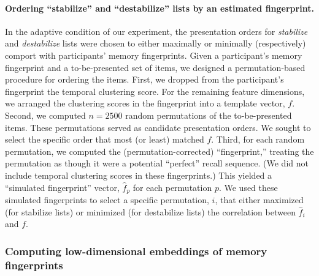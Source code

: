 \documentclass[11pt]{article}
\begin{document}
\paragraph{Ordering ``stabilize'' and ``destabilize'' lists by an estimated
fingerprint.}

In the adaptive condition of our experiment, the presentation orders for
\textit{stabilize} and \textit{destabilize} lists were chosen to either
maximally or minimally (respectively) comport with participants' memory
fingerprints. Given a participant's memory fingerprint and a to-be-presented
set of items, we designed a permutation-based procedure for ordering the items.
First, we dropped from the participant's fingerprint the temporal clustering
score. For the remaining feature dimensions, we arranged the clustering scores
in the fingerprint into a template vector, $f$. Second, we computed $n = 2500$
random permutations of the to-be-presented items. These permutations served as
candidate presentation orders. We sought to select the specific order that most
(or least) matched $f$. Third, for each random permutation, we computed the
(permutation-corrected) ``fingerprint,'' treating the permutation as though it
were a potential ``perfect'' recall sequence. (We did not include temporal
clustering scores in these fingerprints.) This yielded a ``simulated
fingerprint'' vector, $\hat{f}_p$ for each permutation $p$. We used these
simulated fingerprints to select a specific permutation, $i$, that either
maximized (for stabilize lists) or minimized (for destabilize lists) the
correlation between $\hat{f}_i$ and $f$.

\subsubsection*{Computing low-dimensional embeddings of memory fingerprints}
\end{document}
